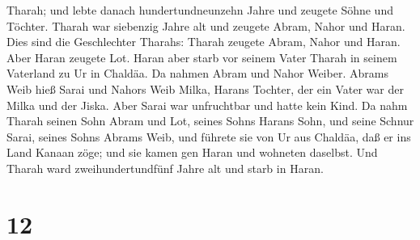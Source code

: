 Tharah;  und lebte danach hundertundneunzehn Jahre und
zeugete Söhne und Töchter.  Tharah war siebenzig Jahre alt
und zeugete Abram, Nahor und Haran.  Dies sind die
Geschlechter Tharahs: Tharah zeugete Abram, Nahor und Haran. Aber Haran
zeugete Lot.  Haran aber starb vor seinem Vater Tharah in
seinem Vaterland zu Ur in Chaldäa.  Da nahmen Abram und
Nahor Weiber. Abrams Weib hieß Sarai und Nahors Weib Milka, Harans
Tochter, der ein Vater war der Milka und der Jiska.  Aber
Sarai war unfruchtbar und hatte kein Kind.  Da nahm Tharah
seinen Sohn Abram und Lot, seines Sohns Harans Sohn, und seine Schnur
Sarai, seines Sohns Abrams Weib, und führete sie von Ur aus Chaldäa, daß
er ins Land Kanaan zöge; und sie kamen gen Haran und wohneten daselbst.
 Und Tharah ward zweihundertundfünf Jahre alt und starb in
Haran.

\hypertarget{section-11}{%
\section{12}\label{section-11}}

